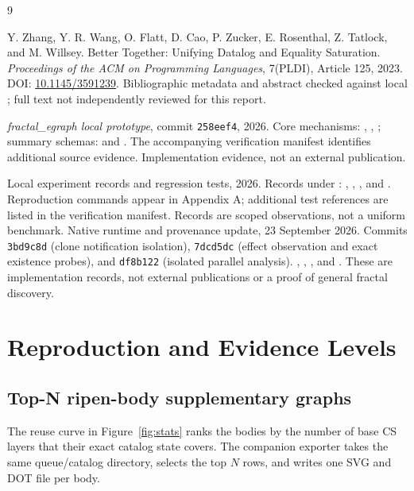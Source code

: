 \documentclass[11pt,a4paper]{article}
\newcommand{\code}[1]{\texttt{#1}}
\begin{document}
\begin{thebibliography}{9}
\raggedright
{}
Y. Zhang, Y. R. Wang, O. Flatt, D. Cao, P. Zucker, E. Rosenthal, Z. Tatlock,
and M. Willsey.
\newblock Better Together: Unifying Datalog and Equality Saturation.
\newblock \emph{Proceedings of the ACM on Programming Languages}, 7(PLDI),
Article 125, 2023. DOI: \href{https://doi.org/10.1145/3591239}{10.1145/3591239}.
\newblock Bibliographic metadata and abstract checked against local
; full text not independently reviewed for this report.

\emph{fractal\_egraph local prototype}, commit \code{258eef4}, 2026.
\newblock Core mechanisms: ,
, ;
summary schemas:  and .
The accompanying verification manifest identifies additional source evidence.
Implementation evidence, not an external publication.

Local experiment records and regression tests, 2026.
\newblock Records under :
, ,
, and .
\newblock Reproduction commands appear in Appendix A; additional test references
are listed in the verification manifest. Records are scoped observations,
not a uniform benchmark.
Native runtime and provenance update, 23 September 2026.
\newblock Commits \code{3bd9c8d} (clone notification isolation),
\code{7dcd5dc} (effect observation and exact existence probes), and
\code{df8b122} (isolated parallel analysis).
\newblock {},
, ,
and . These are implementation records, not external
publications or a proof of general fractal discovery.
\end{thebibliography}

\clearpage
\appendix
\section{Reproduction and Evidence Levels}
\subsection{Top-N ripen-body supplementary graphs}
The reuse curve in Figure~\ref{fig:stats} ranks the bodies by the number of
base CS layers that their exact catalog state covers. The companion exporter
 takes the same queue/catalog directory,
selects the top $N$ rows, and writes one SVG and DOT file per body.
\end{document}
